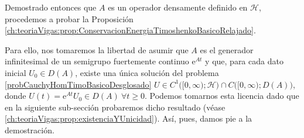 Demostrado entonces que $A$ es un operador densamente definido en $\mathcal{H}$, procedemos a probar la Proposición \ref{ch:teoriaVigas:prop:ConservacionEnergiaTimoshenkoBasicoRelajado}. 

Para ello, nos tomaremos la libertad de asumir que $A$ es el generador infinitesimal de un semigrupo fuertemente continuo $\mathrm{e}^{At}$ y que, para cada dato inicial $U_0 \in D(A)$, existe una única solución del problema \eqref{probCauchyHomTimoBasicoDesglosado} $U \in C^1\big([0,\infty); \mathcal{H}\big) \cap C\big([0,\infty); D(A)\big)$, donde $U(t) = \mathrm{e}^{At}U_0 \in D(A) \ \forall t \geq 0$. Podemos tomarnos esta licencia dado que en la siguiente sub-sección probaremos dicho resultado (véase \ref{ch:teoriaVigas:prop:existenciaYUnicidad}). Así, pues, damos pie a la demostración.

